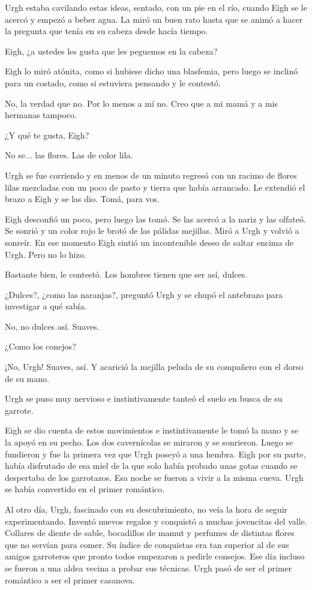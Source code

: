 \documentclass[11pt,twoside,openright,a6paper]{book}
\begin{document}
Urgh estaba cavilando estas ideas, sentado, con un pie en el río, cuando Eigh se le acercó y empezó a beber agua. La miró un buen rato hasta que se animó a hacer la pregunta que tenía en su cabeza desde hacía tiempo.

Eigh, ¿a ustedes les gusta que les peguemos en la cabeza?

Eigh lo miró atónita, como si hubiese dicho una blasfemia, pero luego se inclinó para un costado, como si estuviera pensando y le contestó.

No, la verdad que no. Por lo menos a mí no. Creo que a mi mamá y a mis hermanas tampoco.

¿Y qué te gusta, Eigh?

No se... las flores. Las de color lila.

Urgh se fue corriendo y en menos de un minuto regresó con un racimo de flores lilas mezcladas con un poco de pasto y tierra que había arrancado. Le extendió el brazo a Eigh y se las dio. Tomá, para vos.

Eigh desconfió un poco, pero luego las tomó. Se las acercó a la nariz y las olfateó. Se sonrió y un color rojo le brotó de las pálidas mejillas. Miró a Urgh y volvió a sonreír. En ese momento Eigh sintió un incontenible deseo de saltar encima de Urgh. Pero no lo hizo.

Bastante bien, le contestó. Los hombres tienen que ser así, dulces.

¿Dulces?, ¿como las naranjas?, preguntó Urgh y se chupó el antebrazo para investigar a qué sabía.

No, no dulces así. Suaves.

¿Como los conejos?

¡No, Urgh! Suaves, así. Y acarició la mejilla peluda de su compañero con el dorso de su mano.

Urgh se puso muy nervioso e instintivamente tanteó el suelo en busca de su garrote.

Eigh se dio cuenta de estos movimientos e instintivamente le tomó la mano y se la apoyó en su pecho. Los dos cavernícolas se miraron y se sonrieron. Luego se fundieron y fue la primera vez que Urgh poseyó a una hembra. Eigh por su parte, había disfrutado de esa miel de la que solo había probado unas gotas cuando se despertaba de los garrotazos. Esa noche se fueron a vivir a la misma cueva. Urgh se había convertido en el primer romántico.

Al otro día, Urgh, fascinado con su descubrimiento, no veía la hora de seguir experimentando. Inventó nuevos regalos y conquistó a muchas jovencitas del valle. Collares de diente de sable, bocadillos de mamut y perfumes de distintas flores que no servían para comer. Su índice de conquistas era tan superior al de sus amigos garroteros que pronto todos empezaron a pedirle consejos. Ese día incluso se fueron a una aldea vecina a probar sus técnicas. Urgh pasó de ser el primer romántico a ser el primer casanova. 
\end{document}
